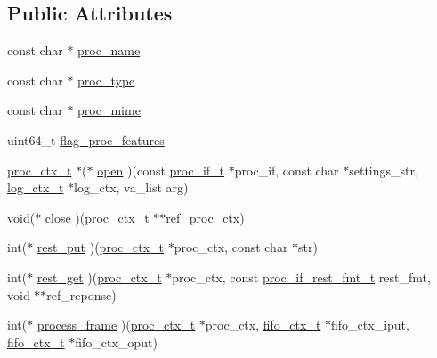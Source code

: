 \subsection*{Public Attributes}
\begin{DoxyCompactItemize}
\item 
const char $\ast$ \hyperlink{structproc__if__s_aa284f1d0bdde2fae0b51101f658430ee}{proc\+\_\+name}
\item 
const char $\ast$ \hyperlink{structproc__if__s_a3a8a04d2e81ca4dfa55a8526644dd729}{proc\+\_\+type}
\item 
const char $\ast$ \hyperlink{structproc__if__s_afdb204f8c976ed829466774aaa6cdf89}{proc\+\_\+mime}
\item 
uint64\+\_\+t \hyperlink{structproc__if__s_a657d976a32c34bff11070599b11c2dd7}{flag\+\_\+proc\+\_\+features}
\item 
\hyperlink{proc_8h_ae264f89be30fc03f5053bc16d58cba05}{proc\+\_\+ctx\+\_\+t} $\ast$($\ast$ \hyperlink{structproc__if__s_a34999576771394dfb721463c8455ba06}{open} )(const \hyperlink{proc_8h_a679816cf30e0b7a8f3e7464e67a6a844}{proc\+\_\+if\+\_\+t} $\ast$proc\+\_\+if, const char $\ast$settings\+\_\+str, \hyperlink{structlog__ctx__s}{log\+\_\+ctx\+\_\+t} $\ast$log\+\_\+ctx, va\+\_\+list arg)
\item 
void($\ast$ \hyperlink{structproc__if__s_af5971ac1d09d1c6ec3508c36fb286c19}{close} )(\hyperlink{proc_8h_ae264f89be30fc03f5053bc16d58cba05}{proc\+\_\+ctx\+\_\+t} $\ast$$\ast$ref\+\_\+proc\+\_\+ctx)
\item 
int($\ast$ \hyperlink{structproc__if__s_acb4d2c240c52904ebd6904f54b1a9b78}{rest\+\_\+put} )(\hyperlink{proc_8h_ae264f89be30fc03f5053bc16d58cba05}{proc\+\_\+ctx\+\_\+t} $\ast$proc\+\_\+ctx, const char $\ast$str)
\item 
int($\ast$ \hyperlink{structproc__if__s_a1e45b33c52b931954f7a0d8a14f0db53}{rest\+\_\+get} )(\hyperlink{proc_8h_ae264f89be30fc03f5053bc16d58cba05}{proc\+\_\+ctx\+\_\+t} $\ast$proc\+\_\+ctx, const \hyperlink{proc__if_8h_a9bea3dae53a91f2a3e3a459d1d3e22b3}{proc\+\_\+if\+\_\+rest\+\_\+fmt\+\_\+t} rest\+\_\+fmt, void $\ast$$\ast$ref\+\_\+reponse)
\item 
int($\ast$ \hyperlink{structproc__if__s_ab67b4061f94b6f15ae40c796b6b33597}{process\+\_\+frame} )(\hyperlink{proc_8h_ae264f89be30fc03f5053bc16d58cba05}{proc\+\_\+ctx\+\_\+t} $\ast$proc\+\_\+ctx, \hyperlink{structfifo__ctx__s}{fifo\+\_\+ctx\+\_\+t} $\ast$fifo\+\_\+ctx\+\_\+iput, \hyperlink{structfifo__ctx__s}{fifo\+\_\+ctx\+\_\+t} $\ast$fifo\+\_\+ctx\+\_\+oput)
\item 

\end{DoxyCompactItemize}
